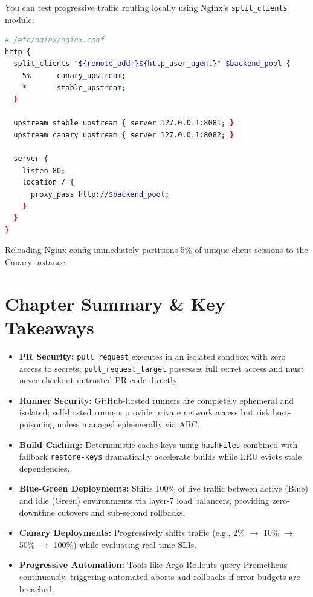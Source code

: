 \begin{tryityourselfbox}
You can test progressive traffic routing locally using Nginx's \texttt{split\_clients} module:
\begin{lstlisting}[language=bash]
# /etc/nginx/nginx.conf
http {
  split_clients "${remote_addr}${http_user_agent}" $backend_pool {
    5%      canary_upstream;
    *       stable_upstream;
  }

  upstream stable_upstream { server 127.0.0.1:8081; }
  upstream canary_upstream { server 127.0.0.1:8082; }

  server {
    listen 80;
    location / {
      proxy_pass http://$backend_pool;
    }
  }
}
\end{lstlisting}
Reloading Nginx config immediately partitions 5\% of unique client sessions to the Canary instance.
\end{tryityourselfbox}

\section{Chapter Summary \& Key Takeaways}
\begin{itemize}[leftmargin=15pt]
  \item \textbf{PR Security:} \texttt{pull\_request} executes in an isolated sandbox with zero access to secrets; \texttt{pull\_request\_target} possesses full secret access and must never checkout untrusted PR code directly.
  \item \textbf{Runner Security:} GitHub-hosted runners are completely ephemeral and isolated; self-hosted runners provide private network access but risk host-poisoning unless managed ephemerally via ARC.
  \item \textbf{Build Caching:} Deterministic cache keys using \texttt{hashFiles} combined with fallback \texttt{restore-keys} dramatically accelerate builds while LRU evicts stale dependencies.
  \item \textbf{Blue-Green Deployments:} Shifts 100\% of live traffic between active (Blue) and idle (Green) environments via layer-7 load balancers, providing zero-downtime cutovers and sub-second rollbacks.
  \item \textbf{Canary Deployments:} Progressively shifts traffic (e.g., 2\% $\to$ 10\% $\to$ 50\% $\to$ 100\%) while evaluating real-time SLIs.
  \item \textbf{Progressive Automation:} Tools like Argo Rollouts query Prometheus continuously, triggering automated aborts and rollbacks if error budgets are breached.
\end{itemize}

